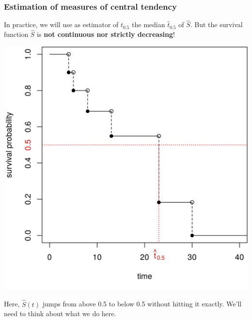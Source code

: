 \documentclass[10pt,t]{beamer}
\begin{document}
\begin{frame}
\frametitle{Estimation of measures of central tendency}
In practice, we will use as estimator of $t_{0.5}$ the median $\hat{t}_{0.5}$ of $\widehat{S}$. But the survival function $\widehat{S}$ is \textbf{not continuous nor strictly decreasing}!

\begin{center}
\includegraphics[width=0.6\textheight]{figs/km_small_example_median.png}
\end{center}
Here, $\hat{S}(t)$ jumps from above 0.5 to below 0.5 without hitting it exactly. We'll need to think about what we do here. 
\end{frame}
 
\end{document}

